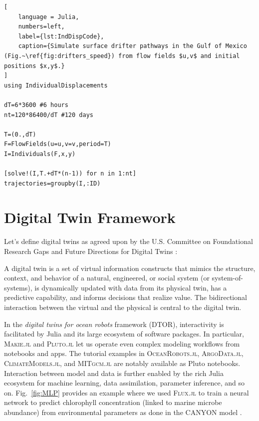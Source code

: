 \documentclass{juliacon}[12pt]
\newcommand{\pkg}[1]{{\small \textsc{#1}}}
\begin{document}
\begin{lstlisting}[
    language = Julia,
    numbers=left,
    label={lst:IndDispCode},
    caption={Simulate surface drifter pathways in the Gulf of Mexico (Fig.~\ref{fig:drifters_speed}) from flow fields $u,v$ and initial positions $x,y$.}
]
using IndividualDisplacements

dT=6*3600 #6 hours
nt=120*86400/dT #120 days

T=(0.,dT)
F=FlowFields(u=u,v=v,period=T)
I=Individuals(F,x,y)

[solve!(I,T.+dT*(n-1)) for n in 1:nt]
trajectories=groupby(I,:ID)
\end{lstlisting}


\section{Digital Twin Framework} \label{sec:DT}

Let's define digital twins as agreed upon by the U.S. Committee on Foundational Research Gaps and Future Directions for Digital Twins \cite{DT2024} : 

\begin{defi}
A digital twin is a set of virtual information constructs that mimics the structure, context, and behavior of a natural, engineered, or social system (or system-of-systems), is dynamically updated with data from its physical twin, has a predictive capability, and informs decisions that realize value. The bidirectional interaction between the virtual and the physical is central to the digital twin.
\end{defi}

In the {\it digital twins for ocean robots} framework (DTOR), interactivity is facilitated by Julia and its large ecosystem of software packages. In particular, \pkg{Makie.jl} \cite{Makie} and \pkg{Pluto.jl} \cite{Pluto} let us operate even complex modeling workflows from notebooks and apps. The tutorial examples in \pkg{OceanRobots.jl}, \pkg{ArgoData.jl}, \pkg{ClimateModels.jl}, and \pkg{MITgcm.jl} \cite{Forget2024b} are notably available as Pluto notebooks. Interaction between model and data is further enabled by the rich Julia ecosystem for machine learning, data assimilation, parameter inference, and so on. Fig.~\ref{fig:MLP} provides an example where we used \pkg{Flux.jl} \cite{Innes2018} to train a neural network to predict chlorophyll concentration (linked to marine microbe abundance) from environmental parameters as done in the CANYON model \cite{Sauzède2017,Bittig2018}.
\end{document}
